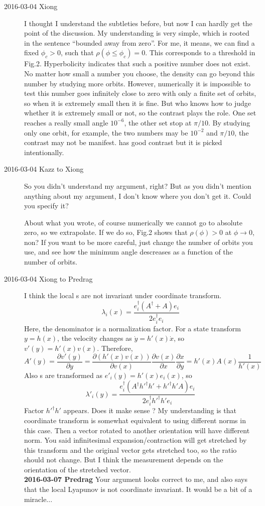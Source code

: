 \begin{description}
\item[2016-03-04 Xiong]
I thought I understand the subtleties before, but now I can
hardly get the point of the discussion.
My understanding is very simple, which is rooted in
the sentence ``bounded away from zero''. For me, it means,
we can find a fixed $\phi_c > 0$, such that
$\rho(\phi \le \phi_c) = 0$. This corresponds to a threshold in
Fig.2. Hyperbolicity indicates that
such a positive number does not exist. No matter
how small a number you choose, the density can go beyond this number
by studying more orbits. However, numerically it is impossible to test
this number goes infinitely close to zero with only a finite set of
orbits, so when it is extremely
small then it is fine. But who knows how to judge whether it is
extremely small or not, so the contrast plays the role. One set
reaches a really small angle $10^{-6}$,
the other set stop at $\pi/10$. By studying only
one orbit, for example, the two numbers may be $10^{-2}$ and $\pi/10$,
the contrast may not be manifest.
 has good contrast but it is picked
intentionally.

\item[2016-03-04 Kazz to Xiong]

So you didn't understand my argument, right? But as you didn't mention anything about my argument, I don't know where you don't get it. Could you specify it?

About what you wrote, of course numerically we cannot go to absolute zero, so we extrapolate. If we do so, Fig.2 shows that $\rho(\phi) > 0$ at $\phi \to 0$,
 non? If you want to be more careful, just change the number of orbits you use, and see how the minimum angle descreases as a function of the number of orbits.


\item[2016-03-04 Xiong to Predrag]
I think the local \Fe s are not invariant under coordinate transform.
\[
  \lambda_i(x) = \frac{e_i^\dagger(A^\dagger+A)e_i}{2e_i^\dagger e_i}
\]
Here, the denominator is a normalization factor. For a state
transform $y=h(x)$, the velocity changes as $\dot{y} = h'(x)\dot{x}$,
so $v'(y) = h'(x) v(x)$. Therefore,
\[
  A'(y) = \frac{\partial v'(y)}{\partial y}
  = \frac{\partial (h'(x)v(x))}{\partial v(x) }
   \frac{\partial v(x)}{\partial x }\frac{\partial x}{\partial y}
  = h'(x) A(x) \frac{1}{h'(x)}
\]
Also \Fv s are transformed as $e'_i(y) = h'(x)e_i(x)$, so
\[
  \lambda'_i(y) = \frac{e_i^\dagger(A^\dagger h'^\dagger h' +
    h'^\dagger h'  A)e_i}
  {2e_i^\dagger h'^\dagger h' e_i}
\]
Factor $ h'^\dagger h'$ appears. Does it make sense ? My
understanding is that coordinate transform is somewhat
equivalent to using different norms in this case.  Then a vector
rotated to another orientation will have different
norm. You said infinitesimal expansion/contraction will get stretched by
this transform and the original vector gets stretched too, so the
ratio should not change. But I think the measurement depends on
the orientation of the stretched vector.
 \\
{\bf 2016-03-07 Predrag} Your argument looks correct to me, and
 also says that the local Lyapunov is not coordinate
invariant. It would be a bit of a miracle...


\end{description}
